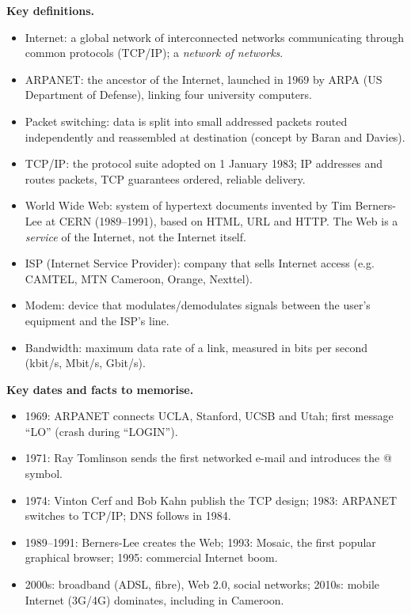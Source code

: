 \documentclass[11pt]{article}
\newcommand{\cle}[1]{{\popxbold\color{popdark}#1}}
\begin{document}
\begin{bilan}
\textbf{Key definitions.}
\begin{itemize}
\item \cle{Internet}: a global network of interconnected networks communicating through common protocols (TCP/IP); a \emph{network of networks}.
\item \cle{ARPANET}: the ancestor of the Internet, launched in 1969 by ARPA (US Department of Defense), linking four university computers.
\item \cle{Packet switching}: data is split into small addressed packets routed independently and reassembled at destination (concept by Baran and Davies).
\item \cle{TCP/IP}: the protocol suite adopted on 1 January 1983; \cle{IP} addresses and routes packets, \cle{TCP} guarantees ordered, reliable delivery.
\item \cle{World Wide Web}: system of hypertext documents invented by Tim Berners-Lee at CERN (1989--1991), based on \cle{HTML}, \cle{URL} and \cle{HTTP}. The Web is a \emph{service} of the Internet, not the Internet itself.
\item \cle{ISP} (Internet Service Provider): company that sells Internet access (e.g. CAMTEL, MTN Cameroon, Orange, Nexttel).
\item \cle{Modem}: device that modulates/demodulates signals between the user's equipment and the ISP's line.
\item \cle{Bandwidth}: maximum data rate of a link, measured in bits per second (kbit/s, Mbit/s, Gbit/s).
\end{itemize}

\textbf{Key dates and facts to memorise.}
\begin{itemize}
\item 1969: ARPANET connects UCLA, Stanford, UCSB and Utah; first message ``LO'' (crash during ``LOGIN'').
\item 1971: Ray Tomlinson sends the first networked e-mail and introduces the @ symbol.
\item 1974: Vinton Cerf and Bob Kahn publish the TCP design; 1983: ARPANET switches to TCP/IP; DNS follows in 1984.
\item 1989--1991: Berners-Lee creates the Web; 1993: Mosaic, the first popular graphical browser; 1995: commercial Internet boom.
\item 2000s: broadband (ADSL, fibre), Web 2.0, social networks; 2010s: mobile Internet (3G/4G) dominates, including in Cameroon.
\end{itemize}


\end{bilan}
\end{document}
